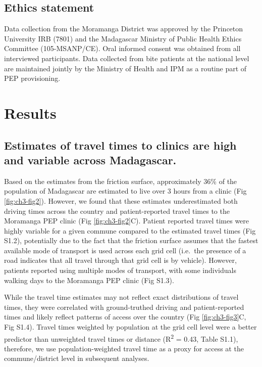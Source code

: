 \documentclass[
  oneside]{book}
\begin{document}
\hypertarget{ethics-statement-1}{%
\subsection{Ethics statement}\label{ethics-statement-1}}

Data collection from the Moramanga District was approved by the
Princeton University IRB (7801) and the Madagascar Ministry of Public
Health Ethics Committee (105-MSANP/CE). Oral informed consent was
obtained from all interviewed participants. Data collected from bite
patients at the national level are maintained jointly by the Ministry of
Health and IPM as a routine part of PEP provisioning.

\hypertarget{results-1}{%
\section{Results}\label{results-1}}

\hypertarget{estimates-of-travel-times-to-clinics-are-high-and-variable-across-madagascar.}{%
\subsection{Estimates of travel times to clinics are high and variable across Madagascar.}\label{estimates-of-travel-times-to-clinics-are-high-and-variable-across-madagascar.}}

Based on the estimates from the friction surface, approximately 36\% of
the population of Madagascar are estimated to live over 3 hours from a
clinic (Fig \ref{fig:ch3-fig2}). However, we found that these estimates underestimated
both driving times across the country and patient-reported travel times
to the Moramanga PEP clinic (Fig \ref{fig:ch3-fig2}C). Patient reported travel times were
highly variable for a given commune compared to the estimated travel
times (Fig S1.2), potentially due to the fact that the friction surface
assumes that the fastest available mode of transport is used across each
grid cell (i.e.~the presence of a road indicates that all travel through
that grid cell is by vehicle). However, patients reported using multiple
modes of transport, with some individuals walking days to the Moramanga
PEP clinic (Fig S1.3).

While the travel time estimates may not reflect exact distributions of
travel times, they were correlated with ground-truthed driving and
patient-reported times and likely reflect patterns of access over the
country (Fig \ref{fig:ch3-fig3}C, Fig S1.4). Travel times weighted by population at the
grid cell level were a better predictor than unweighted travel times or
distance (R\textsuperscript{2} = 0.43, Table S1.1), therefore, we use
population-weighted travel time as a proxy for access at the
commune/district level in subsequent analyses.
\end{document}
